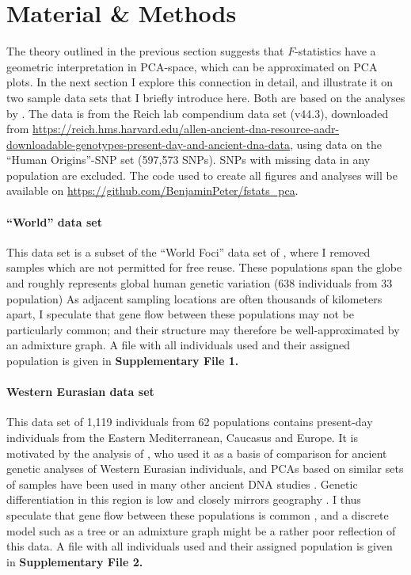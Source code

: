 \documentclass[12pt,fullpage, a4paper]{article}
\begin{document}
\section{Material \& Methods}
The theory outlined in the previous section suggests that $F$-statistics have a geometric interpretation in PCA-space, which can be approximated on PCA plots. In the next section I explore this connection in detail, and illustrate it on two sample data sets that I briefly introduce here. Both are based on the analyses by \cite{lazaridis2014}. The data is from the Reich lab compendium data set (v44.3), downloaded from \url{https://reich.hms.harvard.edu/allen-ancient-dna-resource-aadr-downloadable-genotypes-present-day-and-ancient-dna-data}, using data on the ``Human Origins''-SNP set (597,573 SNPs). SNPs with missing data in any population are excluded. The code used to create all figures and analyses will be available on \url{https://github.com/BenjaminPeter/fstats_pca}.

\paragraph{``World'' data set}
This data set is a subset of the ``World Foci'' data set of \cite{lazaridis2014}, where I removed samples which are not permitted for free reuse. These populations span the globe and roughly represents global human genetic variation (638 individuals from 33 population) As adjacent sampling locations are often thousands of kilometers apart, I speculate that gene flow between these populations may not be particularly common; and their structure may therefore be well-approximated by an admixture graph. A file with all individuals used and their assigned population is given in \textbf{Supplementary File 1.}

\paragraph{Western Eurasian data set}
This data set of 1,119 individuals from 62 populations contains  present-day individuals from the Eastern Mediterranean, Caucasus and Europe. It is motivated by the analysis of \cite{lazaridis2014}, who used it as a basis of comparison for ancient genetic analyses of Western Eurasian individuals, and PCAs based on similar sets of samples have been used in many other ancient DNA studies \citep[e.g.][]{lazaridis2016, haak2015}. Genetic differentiation in this region is low and closely mirrors geography \citep{novembre2008}. I thus speculate that gene flow between these populations is common \citep{ralph2013}, and a discrete model such as a tree or an admixture graph might be a rather poor reflection of this data. A file with all individuals used and their assigned population is given in \textbf{Supplementary File 2.}
\end{document}
